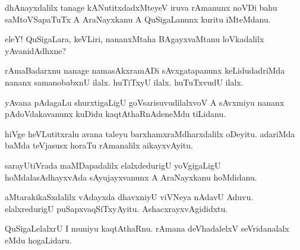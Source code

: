 \documentclass{article}
\begin{document}
\begin{mn}%
dhAnayxdalilx tanage kANutitxdadxMteyeV iruva rAmanunx noVDi bahu saMtoVSapaTuTx A 
AraNayxkanu A QuSigaLanunx kuritu iMteMdanu. 
\end{mn}

\begin{mn}%
eleY! QuSigaLara, keVLiri, nananxMtaha BAgayxvaMtanu loVkadalilx yAvanidAdhxne?
\end{mn}

\begin{mn}%
rAmaBadarxnu nanage namasAkxramADi sAvxgatapanunx keLidudadriMda nananx samanobabxnU 
ilalx. huTiTxyU ilalx. huTuTxvudU ilalx.
\end{mn}

\begin{mn}%
yAvana pAdagaLu shurxtigaLigU goVsarisuvudilalxvoV A sAvxmiyu nananx pAdoVdakavanunx 
kuDidu kaqtAthaRnAdeneMdu tiLidanu.
\end{mn}

\begin{mn}%
hiVge heVLutitxralu avana taleyu barxhamxraMdharxdalilx oDeyitu. adariMda baMda teVjasusx 
horaTu rAmanalilx aikayxvAyitu.
\end{mn}

\begin{mn}%
sarayUtiVrada maMDapadalilx elalxdedurigU yoVgigaLigU hoMdalasAdhayxvAda sAyujayxvanunx A 
AraNayxkanu hoMdidanu.
\end{mn}

\begin{mn}%
aMtarakikaSxdalilx vAdayxda dhavxniyU viVNeya nAdavU Aduvu. elalxredurigU 
puSapxvaqSiTxyAyitu. AshacxrayxvAgididxtu.
\end{mn}

\begin{mn}%
QuSigaLelalxrU I muniyu kaqtAthaRnu. rAmana deVhadalelxV seVridanalalx eMdu hogaLidaru.
\end{mn}

\end{document}
